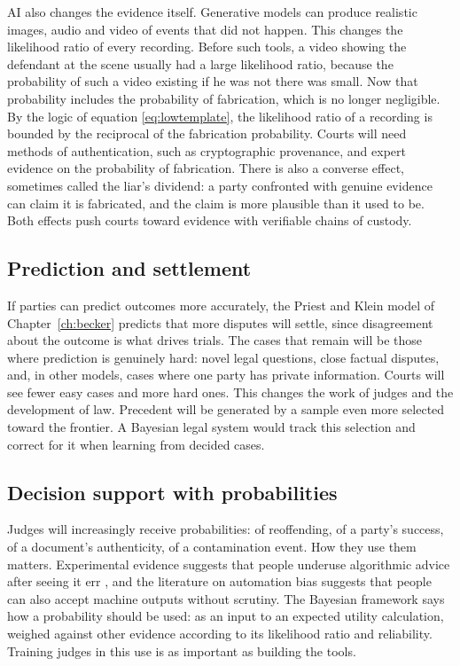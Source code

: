 AI also changes the evidence itself. Generative models can produce realistic images, audio and video of events that did not happen. This changes the likelihood ratio of every recording. Before such tools, a video showing the defendant at the scene usually had a large likelihood ratio, because the probability of such a video existing if he was not there was small. Now that probability includes the probability of fabrication, which is no longer negligible. By the logic of equation \eqref{eq:lowtemplate}, the likelihood ratio of a recording is bounded by the reciprocal of the fabrication probability. Courts will need methods of authentication, such as cryptographic provenance, and expert evidence on the probability of fabrication. There is also a converse effect, sometimes called the liar's dividend: a party confronted with genuine evidence can claim it is fabricated, and the claim is more plausible than it used to be. Both effects push courts toward evidence with verifiable chains of custody.

\subsection{Prediction and settlement}

If parties can predict outcomes more accurately, the Priest and Klein model of Chapter~\ref{ch:becker} predicts that more disputes will settle, since disagreement about the outcome is what drives trials. The cases that remain will be those where prediction is genuinely hard: novel legal questions, close factual disputes, and, in other models, cases where one party has private information. Courts will see fewer easy cases and more hard ones. This changes the work of judges and the development of law. Precedent will be generated by a sample even more selected toward the frontier. A Bayesian legal system would track this selection and correct for it when learning from decided cases.

\subsection{Decision support with probabilities}

Judges will increasingly receive probabilities: of reoffending, of a party's success, of a document's authenticity, of a contamination event. How they use them matters. Experimental evidence suggests that people underuse algorithmic advice after seeing it err \citep{dietvorst2015}, and the literature on automation bias suggests that people can also accept machine outputs without scrutiny. The Bayesian framework says how a probability should be used: as an input to an expected utility calculation, weighed against other evidence according to its likelihood ratio and reliability. Training judges in this use is as important as building the tools.

